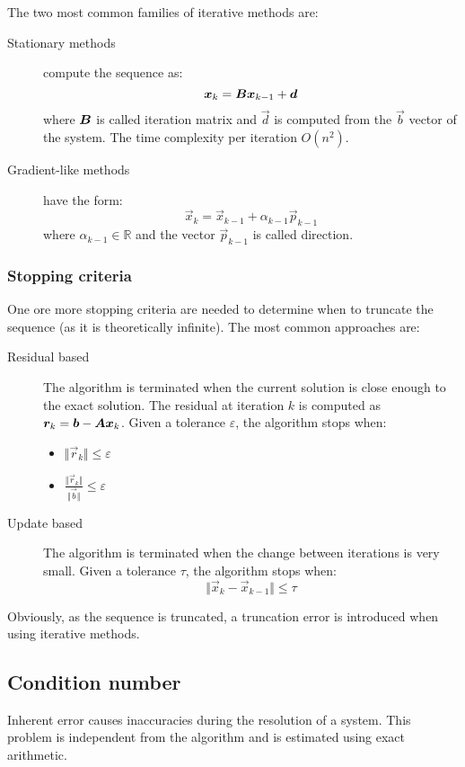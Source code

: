 The two most common families of iterative methods are:
\begin{description}
    \item[Stationary methods] 
        compute the sequence as:
        \[ {\bm{x}}_k = {\bm{B}}{\bm{x}}_{k-1} + {\bm{d}} \]
        where ${\bm{B}}$ is called iteration matrix and $\vec{d}$ is computed from the $\vec{b}$ vector of the system.
        The time complexity per iteration $O(n^2)$.
    
    \item[Gradient-like methods] 
        have the form:
        \[ \vec{x}_k = \vec{x}_{k-1} + \alpha_{k-1}\vec{p}_{k-1} \]
        where $\alpha_{k-1} \in \mathbb{R}$ and the vector $\vec{p}_{k-1}$ is called direction.
\end{description}

\subsubsection{Stopping criteria}
One ore more stopping criteria are needed to determine when to truncate the sequence (as it is theoretically infinite).
The most common approaches are:
\begin{description}
    \item[Residual based]
        The algorithm is terminated when the current solution is close enough to the exact solution.
        The residual at iteration $k$ is computed as ${\bm{r}}_k = {\bm{b}} - {\bm{A}}{\bm{x}}_k$.
        Given a tolerance $\varepsilon$, the algorithm stops when:
        \begin{itemize}
            \item $\Vert \vec{r}_k \Vert \leq \varepsilon$
            \item $\frac{\Vert \vec{r}_k \Vert}{\Vert \vec{b} \Vert} \leq \varepsilon$
        \end{itemize}

    \item[Update based] 
        The algorithm is terminated when the change between iterations is very small.
        Given a tolerance $\tau$, the algorithm stops when:
        \[ \Vert \vec{x}_{k} - \vec{x}_{k-1} \Vert \leq \tau \]
\end{description}
Obviously, as the sequence is truncated, a truncation error is introduced when using iterative methods.



\subsection{Condition number}
Inherent error causes inaccuracies during the resolution of a system.
This problem is independent from the algorithm and is estimated using exact arithmetic.

